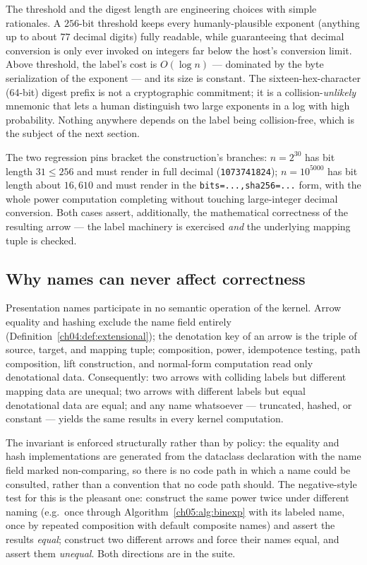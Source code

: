 The threshold and the digest length are engineering choices with simple
rationales. A $256$-bit threshold keeps every humanly-plausible exponent
(anything up to about $77$ decimal digits) fully readable, while
guaranteeing that decimal conversion is only ever invoked on integers far
below the host's conversion limit. Above threshold, the label's cost is
$O(\log n)$ --- dominated by the byte serialization of the exponent ---
and its size is constant. The sixteen-hex-character (64-bit) digest prefix
is not a cryptographic commitment; it is a collision-\emph{unlikely}
mnemonic that lets a human distinguish two large exponents in a log with
high probability. Nothing anywhere depends on the label being
collision-free, which is the subject of the next section.

The two regression pins bracket the construction's branches:
$n = 2^{30}$ has bit length $31 \le 256$ and must render in full decimal
(\texttt{1073741824}); $n = 10^{5000}$ has bit length about $16{,}610$ and
must render in the \texttt{bits=...,sha256=...} form, with the whole power
computation completing without touching large-integer decimal conversion.
Both cases assert, additionally, the mathematical correctness of the
resulting arrow --- the label machinery is exercised \emph{and} the
underlying mapping tuple is checked.

\subsection{Why names can never affect correctness}

\begin{invariant}
\label{ch05:inv:names}
Presentation names participate in no semantic operation of the kernel.
Arrow equality and hashing exclude the name field entirely
(Definition~\ref{ch04:def:extensional}); the denotation key of an arrow is
the triple of source, target, and mapping tuple; composition, power,
idempotence testing, path composition, lift construction, and normal-form
computation read only denotational data. Consequently: two arrows with
colliding labels but different mapping data are unequal; two arrows with
different labels but equal denotational data are equal; and any name
whatsoever --- truncated, hashed, or constant --- yields the same results
in every kernel computation.
\end{invariant}

The invariant is enforced structurally rather than by policy: the equality
and hash implementations are generated from the dataclass declaration with
the name field marked non-comparing, so there is no code path in which a
name could be consulted, rather than a convention that no code path should.
The negative-style test for this is the pleasant one: construct the same
power twice under different naming (e.g.\ once through
Algorithm~\ref{ch05:alg:binexp} with its labeled name, once by repeated
composition with default composite names) and assert the results
\emph{equal}; construct two different arrows and force their names equal,
and assert them \emph{unequal}. Both directions are in the suite.


